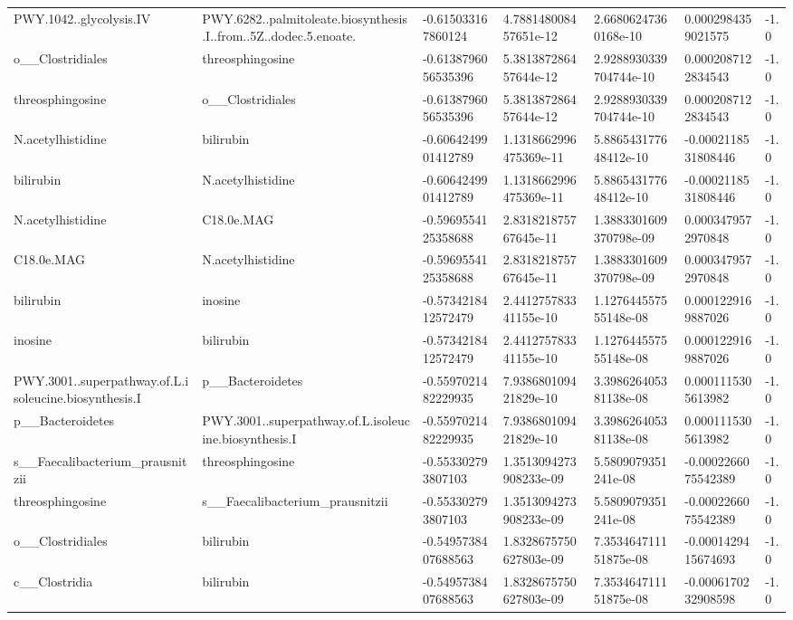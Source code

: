 \begin{longtable}{lllllll}
PWY.1042..glycolysis.IV & PWY.6282..palmitoleate.biosynthesis.I..from..5Z..dodec.5.enoate. & -0.615033167860124 & 4.788148008457651e-12 & 2.66806247360168e-10 & 0.0002984359021575 & -1.0 \\
o\_\_Clostridiales & threosphingosine & -0.6138796056535396 & 5.381387286457644e-12 & 2.9288930339704744e-10 & 0.0002087122834543 & -1.0 \\
threosphingosine & o\_\_Clostridiales & -0.6138796056535396 & 5.381387286457644e-12 & 2.9288930339704744e-10 & 0.0002087122834543 & -1.0 \\
N.acetylhistidine & bilirubin & -0.6064249901412789 & 1.1318662996475369e-11 & 5.886543177648412e-10 & -0.0002118531808446 & -1.0 \\
bilirubin & N.acetylhistidine & -0.6064249901412789 & 1.1318662996475369e-11 & 5.886543177648412e-10 & -0.0002118531808446 & -1.0 \\
N.acetylhistidine & C18.0e.MAG & -0.5969554125358688 & 2.831821875767645e-11 & 1.3883301609370798e-09 & 0.0003479572970848 & -1.0 \\
C18.0e.MAG & N.acetylhistidine & -0.5969554125358688 & 2.831821875767645e-11 & 1.3883301609370798e-09 & 0.0003479572970848 & -1.0 \\
bilirubin & inosine & -0.5734218412572479 & 2.441275783341155e-10 & 1.127644557555148e-08 & 0.0001229169887026 & -1.0 \\
inosine & bilirubin & -0.5734218412572479 & 2.441275783341155e-10 & 1.127644557555148e-08 & 0.0001229169887026 & -1.0 \\
PWY.3001..superpathway.of.L.isoleucine.biosynthesis.I & p\_\_Bacteroidetes & -0.5597021482229935 & 7.938680109421829e-10 & 3.398626405381138e-08 & 0.0001115305613982 & -1.0 \\
p\_\_Bacteroidetes & PWY.3001..superpathway.of.L.isoleucine.biosynthesis.I & -0.5597021482229935 & 7.938680109421829e-10 & 3.398626405381138e-08 & 0.0001115305613982 & -1.0 \\
s\_\_Faecalibacterium\_prausnitzii & threosphingosine & -0.553302793807103 & 1.3513094273908233e-09 & 5.5809079351241e-08 & -0.0002266075542389 & -1.0 \\
threosphingosine & s\_\_Faecalibacterium\_prausnitzii & -0.553302793807103 & 1.3513094273908233e-09 & 5.5809079351241e-08 & -0.0002266075542389 & -1.0 \\
o\_\_Clostridiales & bilirubin & -0.5495738407688563 & 1.8328675750627803e-09 & 7.353464711151875e-08 & -0.0001429415674693 & -1.0 \\
c\_\_Clostridia & bilirubin & -0.5495738407688563 & 1.8328675750627803e-09 & 7.353464711151875e-08 & -0.0006170232908598 & -1.0 \\

\end{longtable}

